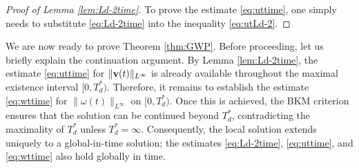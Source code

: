 \documentclass[11pt]{amsart}
\theoremstyle{definition}
\theoremstyle{remark}
\numberwithin{equation}{section}
\numberwithin{equation}{section}
\newcommand{\0}{\emptyset}
\newcommand{\bfv}{{\bf v}}
\begin{document}
\begin{proof}[Proof of Lemma \ref{lem:Ld-2time}]
		To prove the estimate \eqref{eq:uttime}, one simply needs to substitute \eqref{eq:Ld-2time} into the inequality \eqref{eq:utLd-2}.
	\end{proof}
	
We are now ready to prove Theorem \ref{thm:GWP}. Before proceeding, let us briefly explain the continuation argument. By Lemma \ref{lem:Ld-2time}, the estimate \eqref{eq:uttime} for $\|\bfv(t)\|_{L^\infty}$ is already available throughout the maximal existence interval $[0,T_d^*)$. Therefore, it remains to establish the estimate \eqref{eq:wttime} for $\|\omega(t)\|_{L^\infty}$ on $[0,T_d^*)$. Once this is achieved, the BKM criterion ensures that the solution can be continued beyond $T_d^*$, contradicting the maximality of $T_d^*$ unless $T_d^*=\infty$. Consequently, the local solution extends uniquely to a global-in-time solution; the estimates \eqref{eq:Ld-2time}, \eqref{eq:uttime}, and \eqref{eq:wttime} also hold globally in time.
\end{document}
